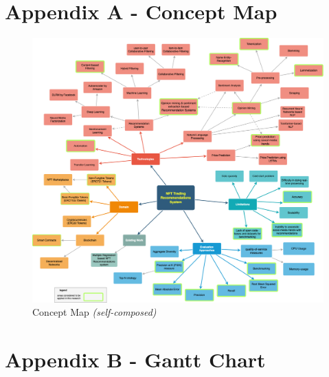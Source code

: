 

\chapter{Appendix A - Concept Map}
\label{appendix:A-concept-map}

\begin{figure}[h!]
\centering
\includegraphics[width=\textwidth]{images/appendix/concept-map.png}
\caption{Concept Map \textit{(self-composed)}}
\label{fig:concept-map}
\end{figure}

\chapter{Appendix B - Gantt Chart}
\label{appendix:B-gantt-chart}

